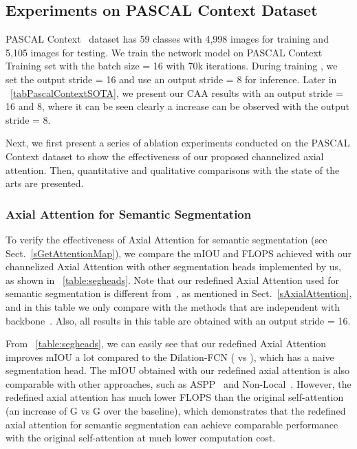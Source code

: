 \documentclass[journal]{IEEEtran}
\begin{document}
\subsection{Experiments on PASCAL Context Dataset}
\label{expAblation}

PASCAL Context~\cite{cPascalContext} dataset has 59 classes with 4,998 images for training and 5,105 images for testing. 
We train the network model on PASCAL Context Training set with the batch size = 16 with 70k iterations. During training , we set the output stride = 16 and use an output stride = 8 for inference.
Later in \tablename{~\ref{tabPascalContextSOTA}}, we present our CAA results with an output stride = 16 and 8, where it can be seen clearly a  increase can be observed with the output stride = 8. 


Next, we first present a series of ablation experiments conducted on the PASCAL Context dataset to show the effectiveness of our proposed channelized axial attention. 
Then, quantitative and qualitative comparisons with the state of the arts are presented. 

\subsubsection{Axial Attention for Semantic Segmentation}

To verify the effectiveness of Axial Attention for semantic segmentation (see Sect.~\ref{sGetAttentionMap}), we compare the mIOU and FLOPS achieved with our channelized Axial Attention with other segmentation heads implemented by us, as shown in \tablename{~\ref{table:segheads}}. 
Note that our redefined Axial Attention used for semantic segmentation is different from~\cite{cAxialDeepLab}, as mentioned in Sect.~\ref{sAxialAttention}, and in this table we only compare with the methods that are independent with backbone~\cite{cResnet}. 
Also, all results in this table are obtained with an output stride = 16. 

From \tablename{~\ref{table:segheads}}, we can easily see that our redefined Axial Attention improves mIOU a lot compared to the Dilation-FCN ( vs ), which has a naive segmentation head. 
The mIOU obtained with our redefined axial attention is also comparable with other approaches, such as ASPP~\cite{cDeepLab, cDeepLabV3Plus} and Non-Local~\cite{cNonLocal}. 
However, the redefined axial attention has much lower FLOPS than the original self-attention~\cite{cNonLocal} (an increase of G vs G over the baseline), which demonstrates that the redefined axial attention for semantic segmentation can achieve comparable performance with the original self-attention at much lower computation cost. \\
\end{document}
